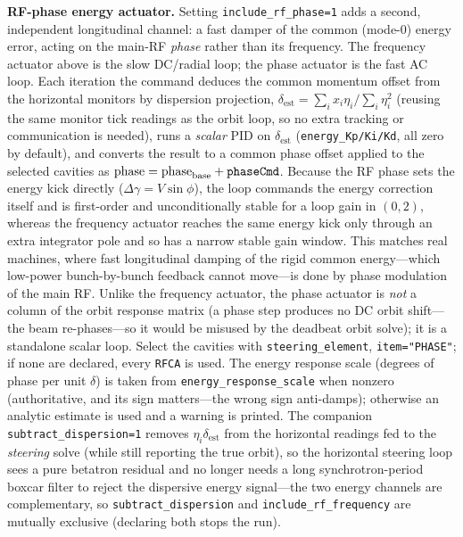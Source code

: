 \documentclass[11pt]{article}
\begin{document}
\textbf{RF-phase energy actuator.}  Setting \verb|include_rf_phase=1| adds a second,
independent longitudinal channel: a fast damper of the common (mode-0) energy error, acting
on the main-RF \emph{phase} rather than its frequency.  The frequency actuator above is the
slow DC/radial loop; the phase actuator is the fast AC loop.  Each iteration the command
deduces the common momentum offset from the horizontal monitors by dispersion projection,
$\delta_{\mathrm{est}}=\sum_i x_i\eta_i/\sum_i\eta_i^2$ (reusing the same monitor tick
readings as the orbit loop, so no extra tracking or communication is needed), runs a
\emph{scalar} PID on $\delta_{\mathrm{est}}$ (\verb|energy_Kp/Ki/Kd|, all zero by default),
and converts the result to a common phase offset applied to the selected cavities as
$\mathrm{phase}=\mathrm{phase}_{\mathrm{base}}+\verb|phaseCmd|$.  Because the RF phase sets
the energy kick directly ($\Delta\gamma=V\sin\phi$), the loop commands the energy correction
itself and is first-order and unconditionally stable for a loop gain in $(0,2)$, whereas the
frequency actuator reaches the same energy kick only through an extra integrator pole and so
has a narrow stable gain window.  This matches real machines, where fast longitudinal
damping of the rigid common energy---which low-power bunch-by-bunch feedback cannot move---is
done by phase modulation of the main RF.  Unlike the frequency actuator, the phase actuator
is \emph{not} a column of the orbit response matrix (a phase step produces no DC orbit
shift---the beam re-phases---so it would be misused by the deadbeat orbit solve); it is a
standalone scalar loop.  Select the cavities with \verb|steering_element|,
\verb|item="PHASE"|; if none are declared, every \verb|RFCA| is used.  The energy response
scale (degrees of phase per unit $\delta$) is taken from \verb|energy_response_scale| when
nonzero (authoritative, and its sign matters---the wrong sign anti-damps); otherwise an
analytic estimate is used and a warning is printed.  The companion
\verb|subtract_dispersion=1| removes $\eta_i\delta_{\mathrm{est}}$ from the horizontal
readings fed to the \emph{steering} solve (while still reporting the true orbit), so the
horizontal steering loop sees a pure betatron residual and no longer needs a long
synchrotron-period boxcar filter to reject the dispersive energy signal---the two energy
channels are complementary, so \verb|subtract_dispersion| and \verb|include_rf_frequency| are
mutually exclusive (declaring both stops the run).
\end{document}
